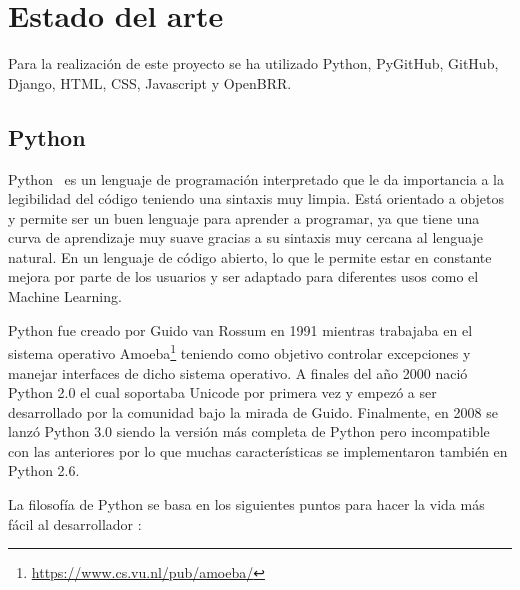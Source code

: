 \documentclass[a4paper, 12pt]{book}
\begin{document}

\cleardoublepage
\chapter{Estado del arte}
\label{chap:estado}

Para la realización de este proyecto se ha utilizado Python, PyGitHub, GitHub, Django, HTML, CSS, Javascript y OpenBRR.

\section{Python}
\label{sec:python}

Python~\cite{website:Python} es un lenguaje de programación interpretado que le da importancia a la legibilidad del código teniendo una sintaxis muy limpia. Está orientado a objetos y permite ser un buen lenguaje para aprender a programar, ya que tiene una curva de aprendizaje muy suave gracias a su sintaxis muy cercana al lenguaje natural. En un lenguaje de código abierto, lo que le permite estar en constante mejora por parte de los usuarios y ser adaptado para diferentes usos como el Machine Learning.

Python fue creado por Guido van Rossum en 1991 mientras trabajaba en el sistema operativo Amoeba\footnote{\url{https://www.cs.vu.nl/pub/amoeba/}} teniendo como objetivo controlar excepciones y manejar interfaces de dicho sistema operativo. A finales del año 2000 nació Python 2.0 el cual soportaba Unicode por primera vez y empezó a ser desarrollado por la comunidad bajo la mirada de Guido. Finalmente, en 2008 se lanzó Python 3.0 siendo la versión más completa de Python pero incompatible con las anteriores por lo que muchas características se implementaron también en Python 2.6.

La filosofía de Python se basa en los siguientes puntos para hacer la vida más fácil al desarrollador\cite{website:FilosofiaPython} :
\end{document}
